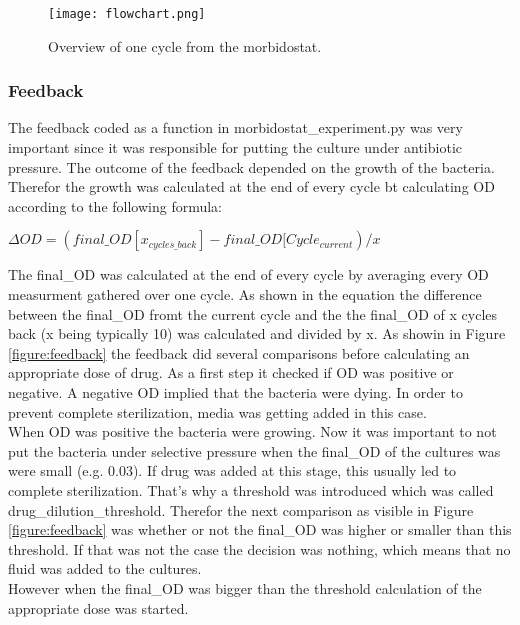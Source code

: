 \begin{figure}
	\texttt{[image: flowchart.png]}
	\caption{Overview of one cycle from the morbidostat.}
	\label{figure:flowchart}	
\end{figure}

\subsubsection{Feedback} 
The feedback coded as a function in morbidostat\_experiment.py was very important since it was responsible for putting the culture under antibiotic pressure. The outcome of the feedback depended on the growth of the bacteria. Therefor the growth was calculated at the end of every cycle bt calculating \textDelta OD according to the following formula:
\begin{center}
	$\Delta OD = (final\_OD[x_{cycles\_back}] - final\_OD[Cycle_{current})/x$
\end{center}
The final\_OD was calculated at the end of every cycle by averaging every OD measurment gathered over one cycle. As shown in the equation the difference between the final\_OD fromt the current cycle and the the final\_OD of x cycles back (x being typically 10) was calculated and divided by x.
As showin in Figure \ref{figure:feedback} the feedback did several comparisons before calculating an appropriate dose of drug. As a first step it checked if \textDelta OD was positive or negative. A negative \textDelta OD implied that the bacteria were dying. In order to prevent complete sterilization, media was getting added in this case. \\
When \textDelta OD was positive the bacteria were growing. Now it was important to not put the bacteria under selective pressure when the final\_OD of the cultures was were small (e.g. 0.03). If drug was added at this stage, this usually led to complete sterilization. That's why a threshold was introduced which was called drug\_dilution\_threshold. Therefor the next comparison as visible in Figure \ref{figure:feedback} was whether or not the final\_OD was higher or smaller than this threshold. If that was not the case the decision was nothing, which means that no fluid was added to the cultures. \\
However when the final\_OD was bigger than the threshold calculation of the appropriate dose was started.
